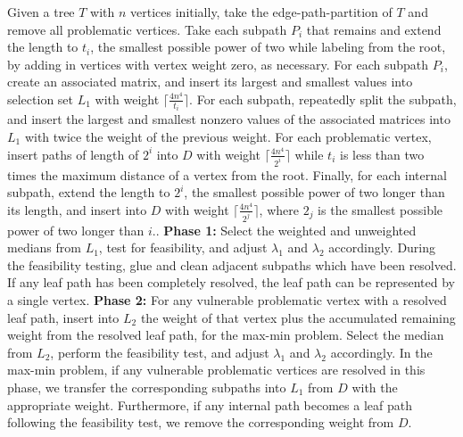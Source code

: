\documentclass[12pt]{article}
\begin{document}
\begin{spacing}{3}
Given a tree $T$ with $n$ vertices initially, take the edge-path-partition of $T$ and remove all problematic vertices. Take each subpath $P_i$ that remains and extend the length to $t_i$, the smallest possible power of two while labeling from the root, by adding in vertices with vertex weight zero, as necessary. For each subpath $P_i$, create an associated matrix, and insert its largest and smallest values into selection set $L_1$ with weight $\lceil\frac{4n^4}{t_i}\rceil$. For each subpath, repeatedly split the subpath, and insert the largest and smallest nonzero values of the associated matrices into $L_1$ with twice the weight of the previous weight. For each problematic vertex, insert paths of length of $2^i$ into $D$ with weight $\lceil\frac{4n^4}{2^i}\rceil$ while $t_i$ is less than two times the maximum distance of a vertex from the root.  Finally, for each internal subpath, extend the length to $2^i$, the smallest possible power of two longer than its length, and insert into $D$ with weight $\lceil\frac{4n^4}{2^j}\rceil$, where $2_j$ is the smallest possible power of two longer than $i$..
\vskip 0.2in\noindent
\textbf{Phase 1:} Select the weighted and unweighted medians from $L_1$, test for feasibility, and adjust $\lambda_1$ and $\lambda_2$ accordingly. During the feasibility testing, glue and clean adjacent subpaths which have been resolved. If any leaf path has been completely resolved, the leaf path can be represented by a single vertex.
\vskip 0.2in\noindent
\textbf{Phase 2:} For any vulnerable problematic vertex with a resolved leaf path, insert into $L_2$ the weight of that vertex plus the accumulated remaining weight from the resolved leaf path, for the max-min problem. Select the median from $L_2$, perform the feasibility test, and adjust $\lambda_1$ and $\lambda_2$ accordingly. In the max-min problem, if any vulnerable problematic vertices are resolved in this phase, we transfer the corresponding subpaths into $L_1$ from $D$ with the appropriate weight. Furthermore, if any internal path becomes a leaf path following the feasibility test, we remove the corresponding weight from $D$.



\end{spacing}
\end{document}
